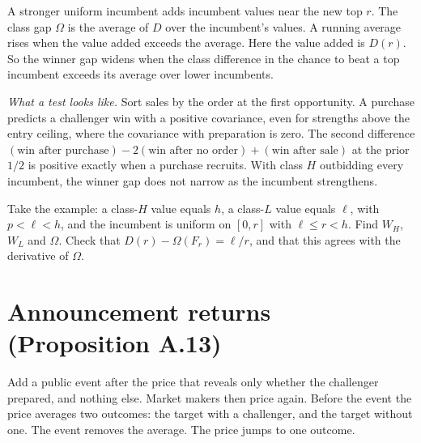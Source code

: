 \begin{intuition}
A stronger uniform incumbent adds incumbent values near the new top \(r\). The class gap \(\Omega\) is the average of \(D\) over the incumbent's values. A running average rises when the value added exceeds the average. Here the value added is \(D(r)\). So the winner gap widens when the class difference in the chance to beat a top incumbent exceeds its average over lower incumbents.
\end{intuition}

\emph{What a test looks like.} Sort sales by the order at the first opportunity. A purchase predicts a challenger win with a positive covariance, even for strengths above the entry ceiling, where the covariance with preparation is zero. The second difference \((\text{win after purchase})-2(\text{win after no order})+(\text{win after sale})\) at the prior \(1/2\) is positive exactly when a purchase recruits. With class \(H\) outbidding every incumbent, the winner gap does not narrow as the incumbent strengthens.

\begin{checkyourself}\label{q:empirical-winner}
Take the example: a class-\(H\) value equals \(h\), a class-\(L\) value equals \(\ell\), with \(p<\ell<h\), and the incumbent is uniform on \([0,r]\) with \(\ell\le r<h\). Find \(W_H\), \(W_L\) and \(\Omega\). Check that \(D(r)-\Omega(F_r)=\ell/r\), and that this agrees with the derivative of \(\Omega\).
\end{checkyourself}

\section{Announcement returns (Proposition A.13)}\label{sec:empirical-announce}

Add a public event after the price that reveals only whether the challenger prepared, and nothing else. Market makers then price again. Before the event the price averages two outcomes: the target with a challenger, and the target without one. The event removes the average. The price jumps to one outcome.


